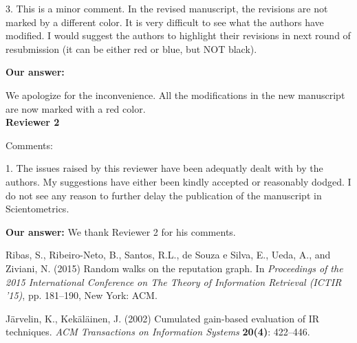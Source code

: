 \documentclass[a4wide,11pt]{article}
\begin{document}
3. This is a minor comment. In the revised manuscript, the revisions are not marked by a different color. It is very difficult to see what the authors have modified. I would suggest the authors to highlight their revisions in next round of resubmission (it can be either red or blue, but NOT black).

{\bf Our answer:}

We apologize for the inconvenience. All the modifications in the new manuscript 
are now marked with a red color.
\\


{\bf Reviewer 2}

\noindent
Comments:

1. The issues raised by this reviewer have been adequatly dealt with by the authors.
My suggestions have either been kindly accepted or reasonably dodged.
I do not see any reason to further delay the publication of the manuscript in Scientometrics.

{\bf Our answer:}
We thank Reviewer 2 for his comments.


\begin{thebibliography}{}

Ribas, S., Ribeiro-Neto, B., Santos, R.L., de Souza e Silva, E., Ueda, A., and Ziviani, N. (2015) 
Random walks on the reputation graph. 
In {\it Proceedings of the 2015 International Conference on The Theory of Information Retrieval (ICTIR ’15)},
pp. 181–190, New York: ACM.

Järvelin, K., Kekäläinen, J. (2002)
Cumulated gain-based evaluation of IR techniques. 
{\it ACM Transactions on Information Systems}
{\bf 20(4)}: 422--446.

\end{thebibliography}
\end{document}
